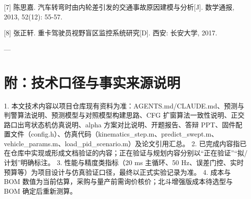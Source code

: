 \documentclass[UTF8,11pt]{ctexart}
\begin{document}
[7] 陈思嘉. 汽车转弯时由内轮差引发的交通事故原因建模与分析[J]. 数学通报, 2013, 52(12): 55-57.

[8] 张正轩. 重卡驾驶员视野盲区监控系统研究[D]. 西安: 长安大学, 2017.

---

\section*{附：技术口径与事实来源说明}
1. 本文技术内容以项目仓库现有资料为准：AGENTS.md/CLAUDE.md、预测与判警算法说明、预测模型与对照模型构建思路、CFG 扩窗算法一致性说明、正交路口出弯状态机仿真说明、alpha 方案对比说明、开题报告、答辩 PPT、固件配置文件（config.h）、仿真代码（kinematics\_step.m、predict\_swept.m、vehicle\_params.m、load\_pid\_scenario.m）及论文引用汇总。 2. 已完成内容指已在仓库中实现或形成文档验证的内容；正在验证与规划内容分别以“正在验证”“拟/计划”明确标注。 3. 性能与精度类指标（20 ms 主循环、50 Hz、误差门控、实时预算等）为项目设计与仿真验证口径，最终以正式实验记录为准。 4. 成本与 BOM 数值为当前估算，采购与量产前需询价核价；北斗增强版成本待选型与 BOM 确定后重新测算。
\end{document}
